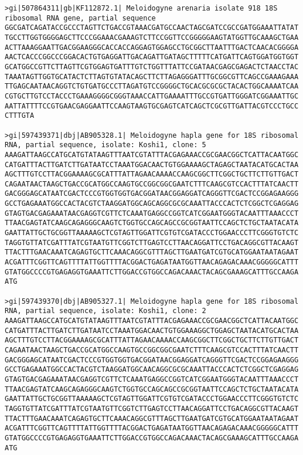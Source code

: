 \documentclass[11pt]{article}
\begin{document}
\begin{Verbatim}[commandchars=\\\{\}]
>gi|507864311|gb|KF112872.1| Meloidogyne arenaria isolate 918 18S ribosomal RNA gene, partial sequence
GGCGATCAGATACCGCCCTAGTTCTGACCGTAAACGATGCCAACTAGCGATCCGCCGATGGAAATTATAT
TGCCTTGGTGGGGAGCTTCCCGGAAACGAAAGTCTTCCGGTTCCGGGGGAAGTATGGTTGCAAAGCTGAA
ACTTAAAGGAATTGACGGAAGGGCACCACCAGGAGTGGAGCCTGCGGCTTAATTTGACTCAACACGGGGA
AACTCACCCGGCCCGGACACTGTGAGGATTGACAGATTGATAGCTTTTTCATGATTCAGTGGATGGTGGT
GCATGGCCGTTCTTAGTTCGTGGAGTGATTTGTCTGGTTTATTCCGATAACGAGCGAGACTCTAACCTAC
TAAATAGTTGGTGCATACTCTTAGTGTATACAGCTTCTTAGAGGGATTTGCGGCGTTCAGCCGAAAGAAA
TTGAGCAATAACAGGTCTGTGATGCCCTTAGATGTCCGGGGCTGCACGCGCGCTACACTGGCAAAATCAA
CGTGCTTGTCCTACCCTGAAAGGGGCGGGTAAACCATTGAAAATTTGCCGTGATTGGGATCGGAAATTGC
AATTATTTTCCGTGAACGAGGAATTCCAAGTAAGTGCGAGTCATCAGCTCGCGTTGATTACGTCCCTGCC
CTTTGTA

>gi|597439371|dbj|AB905328.1| Meloidogyne hapla gene for 18S ribosomal RNA, partial sequence, isolate: Koshi1, clone: 5
AAAGATTAAGCCATGCATGTATAAGTTTAATCGTATTTACGAGAAACCGCGAACGGCTCATTACAATGGC
CATGATTTACTTGATCTTGATAATCCTAAATGGACAACTGTGGAAAAGCTAGAGCTAATACATGCACTAA
AGCTTTGTCCTTACGGAAAAGCGCATTTATTAGAACAAAACCAAGCGGCTTCGGCTGCTTCTTGTTGACT
CAGAATAACTAAGCTGACCGCATGGCCAAGTGCCGGCGGCGAATCTTTCAAGCGTCCACTTTATCAACTT
GACGGGAGCATAATCGACTCCCGTGGTGGTGACGGATAACGGAGGATCAGGGTTCGACTCCGGAGAAGGG
GCCTGAGAAATGGCCACTACGTCTAAGGATGGCAGCAGGCGCGCAAATTACCCACTCTCGGCTCGAGGAG
GTAGTGACGAGAAATAACGAGGTCGTTCTCAAATGAGGCCGGTCATCGGAATGGGTACAATTTAAACCCT
TTAACGAGTATCAAGCAGAGGGCAAGTCTGGTGCCAGCAGCCGCGGTAATTCCAGCTCTGCTAATACATA
GAATTATTGCTGCGGTTAAAAAGCTCGTAGTTGGATTCGTGTCGATACCCTGGAACCCTTCGGGTGTCTC
TAGGTGTTATCGATTTATCGTAATGTTCGGTCTTGAGTCCTTAACAGGATTCCTGACAGGCGTTACAAGT
TTACTTTGAACAAATCAGAGTGCTTCAAACAGGCGTTTAGCTTGAATGATCGTGCATGGAATAATAGAAT
ACGATTTCGGTTCAGTTTTATTGGTTTTACGGACTGAGATAATGGTTAACAGAGACAAACGGGGGCATTT
GTATGGCCCCGTGAGAGGTGAAATTCTTGGACCGTGGCCAGACAAACTACAGCGAAAGCATTTGCCAAGA
ATG

>gi|597439370|dbj|AB905327.1| Meloidogyne hapla gene for 18S ribosomal RNA, partial sequence, isolate: Koshi1, clone: 2
AAAGATTAAGCCATGCATGTATAAGTTTAATCGTATTTACGAGAAACCGCGAACGGCTCATTACAATGGC
CATGATTTACTTGATCTTGATAATCCTAAATGGACAACTGTGGAAAGGCTGGAGCTAATACATGCACTAA
AGCTTTGTCCTTACGGAAAAGCGCATTTATTAGAACAAAACCAAGCGGCTTCGGCTGCTTCTTGTTGACT
CAGAATAACTAAGCTGACCGCATGGCCAAGTGCCGGCGGCGAATCTTTCAAGCGTCCACTTTATCAACTT
GACGGGAGCATAATCGACTCCCGTGGTGGTGACGGATAACGGAGGATCAGGGTTCGACTCCGGAGAAGGG
GCCTGAGAAATGGCCACTACGTCTAAGGATGGCAACAGGCGCGCAAATTACCCACTCTCGGCTCGAGGAG
GTAGTGACGAGAAATAACGAGGTCGTTCTCAAATGAGGCCGGTCATCGGAATGGGTACAATTTAAACCCT
TTAACGAGTATCAAGCAGAGGGCAAGTCTGGTGCCAGCAGCCGCGGTAATTCCAGCTCTGCTAATACATA
GAATTATTGCTGCGGTTAAAAAGCTCGTAGTTGGATTCGTGTCGATACCCTGGAACCCTTCGGGTGTCTC
TAGGTGTTATCGATTTATCGTAATGTTCGGTCTTGAGTCCTTAACAGGATTCCTGACAGGCGTTACAAGT
TTACTTTGAACAAATCAGAGTGCTTCAAACAGGCGTTTAGCTTGAATGATCGTGCATGGAATAATAGAAT
ACGATTTCGGTTCAGTTTTATTGGTTTTACGGACTGAGATAATGGTTAACAGAGACAAACGGGGGCATTT
GTATGGCCCCGTGAGAGGTGAAATTCTTGGACCGTGGCCAGACAAACTACAGCGAAAGCATTTGCCAAGA
ATG


\end{Verbatim}
\end{document}
